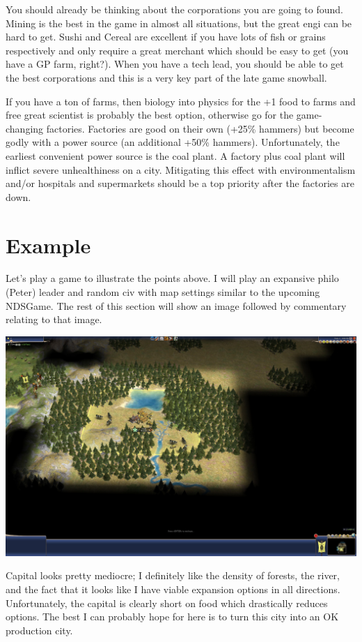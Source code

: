 \documentclass[10pt]{article}
\begin{document}
You should already be thinking about the corporations you are going to
found. Mining is the best in the game in almost all situations, but
the great engi can be hard to get. Sushi and Cereal are excellent if
you have lots of fish or grains respectively and only require a great
merchant which should be easy to get (you have a GP farm,
right?). When you have a tech lead, you should be able to get the best
corporations and this is a very key part of the late game snowball.

If you have a ton of farms, then biology into physics for the +1 food
to farms and free great scientist is probably the best option,
otherwise go for the game-changing factories. Factories are good on
their own (+25\% hammers) but become godly with a power source (an
additional +50\% hammers). Unfortunately, the earliest convenient
power source is the coal plant. A factory plus coal plant will inflict
severe unhealthiness on a city. Mitigating this effect with
environmentalism and/or hospitals and supermarkets should be a top
priority after the factories are down.

\section*{Example}

Let's play a game to illustrate the points above. I will play an
expansive philo (Peter) leader and random civ with map settings similar to
the upcoming NDSGame. The rest of this section will show an image followed
by commentary relating to that image.

\graphicspath{{images/}}

\includegraphics[width=1.0\textwidth]{1}

Capital looks pretty mediocre; I definitely like the density of forests, the river,
and the fact that it looks like I have viable expansion options in all directions.
Unfortunately, the capital is clearly short on food which drastically reduces options.
The best I can probably hope for here is to turn this city into an OK production city.
\end{document}
